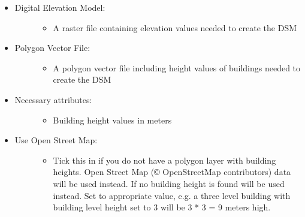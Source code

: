 \documentclass[letterpaper,10pt,english]{sphinxmanual}
\begin{document}
\begin{itemize}
\item {} \begin{description}
\item[{Digital Elevation Model:}] \leavevmode\begin{itemize}
\item {} 
A raster file containing elevation values needed to create the DSM

\end{itemize}

\end{description}

\item {} \begin{description}
\item[{Polygon Vector File:}] \leavevmode\begin{itemize}
\item {} 
A polygon vector file including height values of buildings needed to create the DSM

\end{itemize}

\end{description}

\item {} \begin{description}
\item[{Necessary attributes:}] \leavevmode\begin{itemize}
\item {} 
Building height values in meters

\end{itemize}

\end{description}

\item {} \begin{description}
\item[{Use Open Street Map:}] \leavevmode\begin{itemize}
\item {} 
Tick this in if you do not have a polygon layer with building heights. Open Street Map (© OpenStreetMap contributors) data will be used instead. If no building height is found  will be used instead. Set to appropriate value, e.g. a three level building with building level height set to 3 will be 3 * 3 = 9 meters high.

\end{itemize}


\end{description}
\end{itemize}
\end{document}
